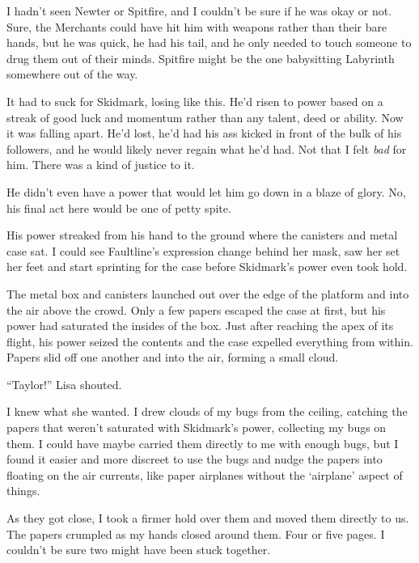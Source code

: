 I hadn't seen Newter or Spitfire, and I couldn't be sure if he was okay or not.  Sure, the Merchants could have hit him with weapons rather than their bare hands, but he was quick, he had his tail, and he only needed to touch someone to drug them out of their minds.  Spitfire might be the one babysitting Labyrinth somewhere out of the way.



It had to suck for Skidmark, losing like this.  He'd risen to power based on a streak of good luck and momentum rather than any talent, deed or ability.  Now it was falling apart.  He'd lost, he'd had his ass kicked in front of the bulk of his followers, and he would likely never regain what he'd had.  Not that I felt \emph{bad} for him.  There was a kind of justice to it.



He didn't even have a power that would let him go down in a blaze of glory.  No, his final act here would be one of petty spite.



His power streaked from his hand to the ground where the canisters and metal case sat.  I could see Faultline's expression change behind her mask, saw her set her feet and start sprinting for the case before Skidmark's power even took hold.



The metal box and canisters launched out over the edge of the platform and into the air above the crowd.  Only a few papers escaped the case at first, but his power had saturated the insides of the box.  Just after reaching the apex of its flight, his power seized the contents and the case expelled everything from within.  Papers slid off one another and into the air, forming a small cloud.



``Taylor!'' Lisa shouted.



I knew what she wanted.  I drew clouds of my bugs from the ceiling, catching the papers that weren't saturated with Skidmark's power, collecting my bugs on them.  I could have maybe carried them directly to me with enough bugs, but I found it easier and more discreet to use the bugs and nudge the papers into floating on the air currents, like paper airplanes without the `airplane' aspect of things.



As they got close, I took a firmer hold over them and moved them directly to us.  The papers crumpled as my hands closed around them.  Four or five pages.  I couldn't be sure two might have been stuck together.



